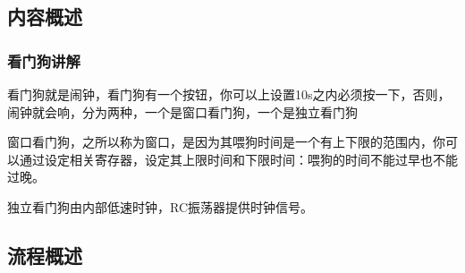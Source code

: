 \documentclass[UTF8]{ctexart}
\begin{document}
\subsection{内容概述}
\subsubsection{看门狗讲解}
看门狗就是闹钟，看门狗有一个按钮，你可以上设置10s之内必须按一下，否则，闹钟就会响，分为两种，一个是窗口看门狗，一个是独立看门狗

窗口看门狗，之所以称为窗口，是因为其喂狗时间是一个有上下限的范围内，你可以通过设定相关寄存器，设定其上限时间和下限时间：喂狗的时间不能过早也不能过晚。

独立看门狗由内部低速时钟，RC振荡器提供时钟信号。

\subsection{流程概述}
\end{document}
